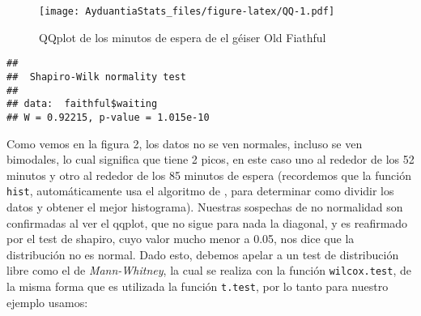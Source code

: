 \documentclass[]{book}
\newenvironment{Shaded}{\begin{snugshade}}{\end{snugshade}}
\newcommand{\DataTypeTok}[1]{\textcolor[rgb]{0.13,0.29,0.53}{#1}}
\newcommand{\DecValTok}[1]{\textcolor[rgb]{0.00,0.00,0.81}{#1}}
\newcommand{\KeywordTok}[1]{\textcolor[rgb]{0.13,0.29,0.53}{\textbf{#1}}}
\newcommand{\NormalTok}[1]{#1}
\newcommand{\OperatorTok}[1]{\textcolor[rgb]{0.81,0.36,0.00}{\textbf{#1}}}
\newcommand{\StringTok}[1]{\textcolor[rgb]{0.31,0.60,0.02}{#1}}
\begin{document}
\begin{Shaded}
\end{Shaded}

\begin{figure}
\centering
\texttt{[image: AyduantiaStats\_files/figure-latex/QQ-1.pdf]}
\caption{\label{fig:QQ}QQplot de los minutos de espera de el géiser Old Fiathful}
\end{figure}

\begin{Shaded}
\end{Shaded}

\begin{verbatim}
## 
##  Shapiro-Wilk normality test
## 
## data:  faithful$waiting
## W = 0.92215, p-value = 1.015e-10
\end{verbatim}

Como vemos en la figura 2, los datos no se ven normales, incluso se ven bimodales, lo cual significa que tiene 2 picos, en este caso uno al rededor de los 52 minutos y otro al rededor de los 85 minutos de espera (recordemos que la función \texttt{hist}, automáticamente usa el algoritmo de \citet{sturges1926choice}, para determinar como dividir los datos y obtener el mejor histograma). Nuestras sospechas de no normalidad son confirmadas al ver el qqplot, que no sigue para nada la diagonal, y es reafirmado por el test de shapiro, cuyo valor mucho menor a 0.05, nos dice que la distribución no es normal. Dado esto, debemos apelar a un test de distribución libre como el de \emph{Mann-Whitney}, la cual se realiza con la función \texttt{wilcox.test}, de la misma forma que es utilizada la función \texttt{t.test}, por lo tanto para nuestro ejemplo usamos:

\begin{Shaded}
\end{Shaded}
\end{document}
